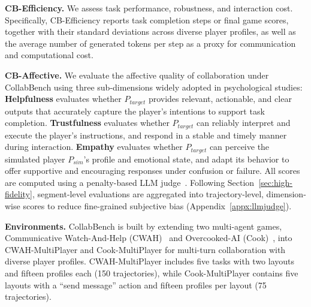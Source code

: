 \documentclass{article}
\theoremstyle{plain}
\theoremstyle{definition}
\theoremstyle{remark}
\begin{document}
\textbf{CB-Efficiency.} We assess task performance, robustness, and interaction cost. Specifically, CB-Efficiency reports task completion steps or final game scores, together with their standard deviations across diverse player profiles, as well as the average number of generated tokens per step as a proxy for communication and computational cost.

\textbf{CB-Affective.} We evaluate the affective quality of collaboration under CollabBench using three sub-dimensions widely adopted in psychological studies: \textbf{Helpfulness} evaluates whether $P_{target}$ provides relevant, actionable, and clear outputs that accurately capture the player’s intentions to support task completion. \textbf{Trustfulness} evaluates whether $P_{target}$ can reliably interpret and execute the player’s instructions, and respond in a stable and timely manner during interaction. \textbf{Empathy} evaluates whether $P_{target}$ can perceive the simulated player $P_{sim}$'s profile and emotional state, and adapt its behavior to offer supportive and encouraging responses under confusion or failure. All scores are computed using a penalty-based LLM judge~\cite{0001WZY00YGC00X25}. Following Section~\ref{sec:high-fidelity}, segment-level evaluations are aggregated into trajectory-level, dimension-wise scores to reduce fine-grained subjective bias (Appendix~\ref{appx:llmjudge}).

\textbf{Environments.} CollabBench is built by extending two multi-agent games, Communicative Watch-And-Help (CWAH)~\cite{ZhangDSZDTSG24} and Overcooked-AI (Cook)~\cite{CarrollSHGSAD19}, into CWAH-MultiPlayer and Cook-MultiPlayer for multi-turn collaboration with diverse player profiles. CWAH-MultiPlayer includes five tasks with two layouts and fifteen profiles each (150 trajectories), while Cook-MultiPlayer contains five layouts with a ``send message'' action and fifteen profiles per layout (75 trajectories).
\end{document}
